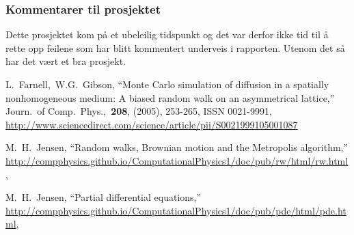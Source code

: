 \documentclass[norsk, 10pt]{article}
\begin{document}
\subsubsection*{Kommentarer til prosjektet}
Dette prosjektet kom på et ubeleilig tidspunkt og det var derfor ikke tid til å rette opp feilene som har blitt kommentert underveis i rapporten. Utenom det så har det vært et bra prosjekt.

\begin{thebibliography}{9}
L.~Farnell,~W.G.~Gibson,
``Monte Carlo simulation of diffusion in a spatially nonhomogeneous medium: A biased random walk on an asymmetrical lattice,''
Journ.\ of Comp.\ Phys.,\ {\bf208}, (2005), 253-265, ISSN 0021-9991, \url{http://www.sciencedirect.com/science/article/pii/S0021999105001087}

M.~H.~Jensen,
``Random walks, Brownian motion and the Metropolis algorithm,''
\url{http://compphysics.github.io/ComputationalPhysics1/doc/pub/rw/html/rw.html}, 

M.~H.~Jensen,
``Partial differential equations,''
\url{http://compphysics.github.io/ComputationalPhysics1/doc/pub/pde/html/pde.html}, 


\end{thebibliography}  
\end{document}
